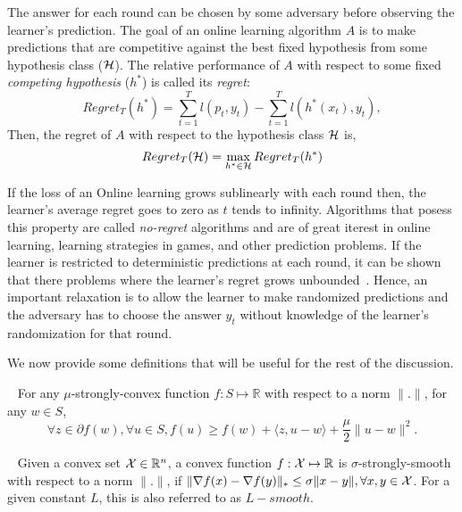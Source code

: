 The answer for each round can be chosen by some
adversary before observing the learner's prediction.
The goal of an online learning algorithm $A$ is to make predictions that are competitive against
the best fixed hypothesis from some hypothesis class ($\mathcal{H}$).
The relative performance of $A$ with respect to some fixed \textit{competing hypothesis} ($h^\ast$)
is called its \textit{regret}:
\begin{equation}
	\label{eqn:regret} Regret_T(h^*) = \sum_{t=1}^T
	l(p_t, y_t) - \sum_{t=1}^T l(h^*(x_t), y_t),
\end{equation} Then, the regret of $A$ with respect to
the hypothesis class $\mathcal{H}$ is,
\begin{equation}
	\label{eqn:regret_all} Regret_T(\mathcal{H}) =
	\max_{h^* \in \mathcal{H}} Regret_T(h^*)
\end{equation}

If the loss of an Online
learning grows sublinearly with each round then, the learner's average regret goes to zero as $t$
tends to infinity.
Algorithms that posess this property are called \textit{no-regret} algorithms and are of great
iterest in online learning, learning strategies in games, and other prediction problems.
If the learner is restricted to deterministic predictions at each round, it can be shown that there
problems where the learner's regret grows unbounded~\cite{coverBehavior1965}.
Hence, an important relaxation is to allow the learner to make randomized predictions and the
adversary has to choose the answer $y_t$ without knowledge of the learner's randomization for that
round.

We now provide some definitions that will be useful for the rest of the discussion.

\begin{definition}
	~\label{def:strconvex}
	For any $\mu$-strongly-convex function $f: S \mapsto \mathbb{R}$ with respect to a norm $\|.
		\|$, for any $w \in S$,
	\begin{equation}
		\forall z \in \partial f(w), \forall u \in S, f(u) \geq f(w) + \langle z, u - w\rangle + \frac{\mu}{2}\| u - w \|^2.
	\end{equation}
\end{definition}

\begin{definition}~\label{def:strsmooth}
	Given a convex set $\mathcal{X} \in \mathbb{R}^n$, a convex function $f: \mathcal{X} \mapsto \mathbb{R}$ is
	$\sigma$-strongly-smooth with respect to a norm $\|.
		\|$, if $\|\nabla f(x) - \nabla f(y) \|_{\ast} \leq \sigma \|x - y \|, \forall x, y \in \mathcal{X}$.
	For a given constant $L$, this is also referred to as $L-smooth$.
\end{definition}

